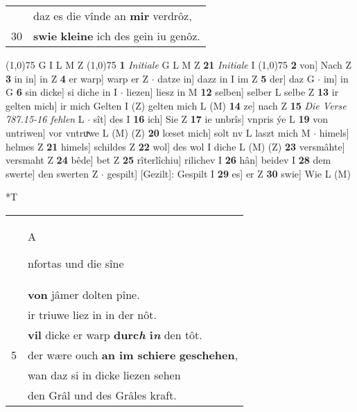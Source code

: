 \documentclass[8pt,a4paper,notitlepage]{article}
\begin{document}
\begin{table}[ht]
\begin{minipage}[t]{0.5\linewidth}
\begin{tabular}{rl}
 & daz es die vînde an \textbf{mir} verdrôz,\\ 
30 & \textbf{swie} \textbf{kleine} ich des gein iu genôz.\\ 
\end{tabular}
\scriptsize
\line(1,0){75} \newline
G I L M Z \newline
\line(1,0){75} \newline
\textbf{1} \textit{Initiale} G L M Z  \textbf{21} \textit{Initiale} I  \newline
\line(1,0){75} \newline
\textbf{2} von] Nach Z \textbf{3} in in] in Z \textbf{4} er warp] warp er Z  $\cdot$ datze in] dazz in I im Z \textbf{5} der] daz G  $\cdot$ im] in G \textbf{6} sin dicke] si diche in I  $\cdot$ liezen] liesz in M \textbf{12} selben] selber L selbe Z \textbf{13} ir gelten mich] ir mich Gelten I (Z) gelten mich L (M) \textbf{14} ze] nach Z \textbf{15} \textit{Die Verse 787.15-16 fehlen} L   $\cdot$ sît] des I \textbf{16} ich] Sie Z \textbf{17} ie unbrîs] vnpris ýe L \textbf{19} von untriwen] vor vntruͯwe L (M) (Z) \textbf{20} lœset mich] solt nv L laszt mich M  $\cdot$ himels] helmes Z \textbf{21} himels] schildes Z \textbf{22} wol] des wol I diche L (M) (Z) \textbf{23} versmâhte] versmaht Z \textbf{24} bêde] bet Z \textbf{25} rîterlîchiu] rilichev I \textbf{26} hân] beidev I \textbf{28} dem swerte] den swerten Z  $\cdot$ gespilt] [Gezilt]: Gespilt I \textbf{29} es] er Z \textbf{30} swie] Wie L (M) \newline
\end{minipage}
\hspace{0.5cm}
\begin{minipage}[t]{0.5\linewidth}
\small
\begin{center}*T
\end{center}
\begin{tabular}{rl}
 & \begin{Large}A\end{Large}nfortas und die sîne\\ 
 & \textbf{von} jâmer dolten pîne.\\ 
 & ir triuwe liez in in der nôt.\\ 
 & \textbf{vil} dicke er warp \textbf{durc\textit{h} i\textit{n}} den tôt.\\ 
5 & der wære ouch \textbf{an im schiere} \textbf{geschehen},\\ 
 & wan daz si in dicke liezen sehen\\ 
 & den Grâl und des Grâles kraft.\\ 

\end{tabular}
\end{minipage}
\end{table}
\end{document}

